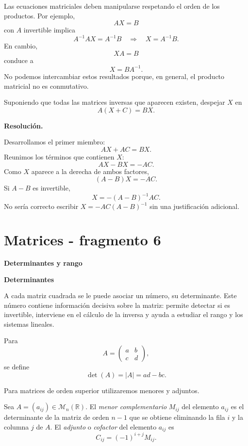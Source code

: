 Las ecuaciones matriciales deben manipularse respetando el orden de los productos. Por ejemplo,
\[
AX=B
\]
con $A$ invertible implica
\[
A^{-1}AX=A^{-1}B
\quad\Longrightarrow\quad
X=A^{-1}B.
\]
En cambio,
\[
XA=B
\]
conduce a
\[
X=BA^{-1}.
\]
No podemos intercambiar estos resultados porque, en general, el producto matricial no es conmutativo.

\begin{solvedexercise}
Suponiendo que todas las matrices inversas que aparecen existen, despejar $X$ en
\[
A(X+C)=BX.
\]

\textbf{Resolución.}\par\smallskip
Desarrollamos el primer miembro:
\[
AX+AC=BX.
\]
Reunimos los términos que contienen $X$:
\[
AX-BX=-AC.
\]
Como $X$ aparece a la derecha de ambos factores,
\[
(A-B)X=-AC.
\]
Si $A-B$ es invertible,
\[
\boxed{X=-(A-B)^{-1}AC.}
\]
No sería correcto escribir $X=-AC(A-B)^{-1}$ sin una justificación adicional.
\end{solvedexercise}


\section{Matrices - fragmento 6}
\textbf{Determinantes y rango}

\textbf{Determinantes}

A cada matriz cuadrada se le puede asociar un número, su determinante. Este número contiene información decisiva sobre la matriz: permite detectar si es invertible, interviene en el cálculo de la inversa y ayuda a estudiar el rango y los sistemas lineales.

\begin{definition}
Para
\[
A=\begin{pmatrix}a&b\\c&d\end{pmatrix},
\]
se define
\[
\det(A)=|A|=ad-bc.
\]
\end{definition}

Para matrices de orden superior utilizaremos menores y adjuntos.

\begin{definition}
Sea $A=(a_{ij})\in\mathcal M_n(\mathbb{R})$. El \emph{menor complementario} $M_{ij}$ del elemento $a_{ij}$ es el determinante de la matriz de orden $n-1$ que se obtiene eliminando la fila $i$ y la columna $j$ de $A$. El \emph{adjunto} o \emph{cofactor} del elemento $a_{ij}$ es
\[
C_{ij}=(-1)^{i+j}M_{ij}.
\]
\end{definition}

